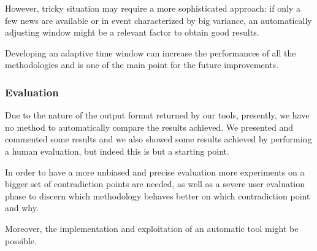 However, tricky situation may require a more sophisticated approach: if only a
few news are available or in event characterized by big variance, an
automatically adjusting window might be a relevant factor to obtain good
results.

Developing an adaptive time window can increase the performances of all the methodologies and is one of the main point for the future improvements.

\subsubsection*{Evaluation}
Due to the nature of the output format returned by our tools, presently, we have
no method to automatically compare the results achieved. We presented and
commented some results and we also showed some results achieved by performing a
human evaluation, but indeed this is but a starting point.

In order to have a more unbiased and precise evaluation more experiments on a
bigger set of contradiction points are needed, as well as a severe user
evaluation phase to discern which methodology behaves better on which
contradiction point and why.

Moreover, the implementation and exploitation of an automatic tool might be
possible.

